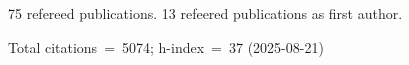 75 refereed publications. 13 refeered publications as first author.

Total citations~=~5074; h-index~=~37 (2025-08-21)